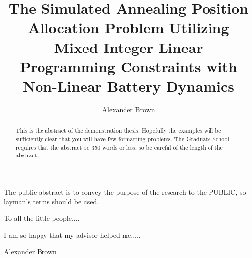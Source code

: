 \documentclass[ee,thesis]{usuthesis}
\author{Alexander Brown}
\date{}
\title{The Simulated Annealing Position Allocation Problem Utilizing Mixed Integer Linear Programming Constraints with Non-Linear Battery Dynamics}
\begin{document}
\let\ref\autoref                            %

\preliminaries   %

\maketitle

\tableofcontents
\listoftables
\listoffigures

\begin{abstract}

This is the abstract of the demonstration thesis.  Hopefully the
examples will be sufficiently clear that you will have few formatting
problems. The Graduate School requires that the abstract be 350 words
or less, so be careful of the length of the abstract.

\end{abstract}

\begin{publicabstract}

The public abstract is to convey the purpose of the research to the
PUBLIC, so layman's terms should be used.


\end{publicabstract}
\begin{dedication}
\begin{center}
To all the little people....
\end{center}
%
\end{dedication}
\begin{acknowledgments}
I am so happy that my advisor helped me.....
\\
\begin{flushright}
Alexander Brown
\end{flushright}
\end{acknowledgments}

\body  %
\end{document}
